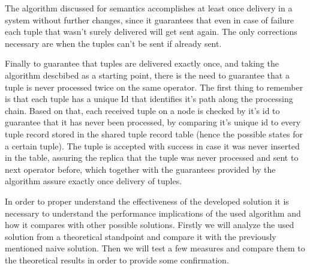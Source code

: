 \documentclass[times, 10pt,twocolumn]{article}
\newcommand{\forceindent}{\leavevmode{\parindent=1em\indent}}
\begin{document}

The algorithm discussed for semantics accomplishes at least once delivery in 
a system without further changes, since it guarantees that even in case of failure each tuple that wasn't surely delivered will get sent again. The only corrections necessary are when the tuples can't be sent if already sent.

\forceindent Finally to guarantee that tuples are delivered exactly
once, and taking the algorithm descbibed as a starting point, there is the
need to guarantee that a tuple is never processed twice on the same
operator. The first thing to remember is that each tuple has a unique Id
that identifies it's path along the processing chain. Based on that, each
received tuple on a node is checked by it's id to guarantee that it has
never been processed, by comparing it's unique id to every tuple record
stored in the shared tuple record table (hence the possible states for a
certain tuple).  The tuple is accepted with success in case it was never
inserted in the table, assuring the replica that the tuple was never
processed and sent to next operator before, which together with the
guarantees provided by the algorithm assure exactly once delivery of
tuples.


In order to proper understand the effectiveness of the developed solution
it is necessary to understand the performance implications of the used
algorithm and how it compares with other possible solutions. Firstly we
will analyze the used solution from a theoretical standpoint and compare
it with the previously mentioned naive solution. Then we will test a few
measures and compare them to the theoretical results in order to provide
some confirmation.

\end{document}
